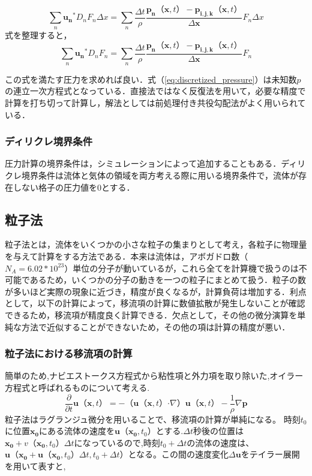 \documentclass[a4j,12pt]{jreport}
\begin{document}
$$ \sum_{n}\bm{u_n}^*D_nF_n\varDelta x = \sum_{n}\frac{\varDelta t}{\rho}\frac{\bm{p_n}（\bm{x},t） - \bm{p_{i,j,k}}（\bm{x},t）}{\varDelta \bm{x}}F_n\varDelta x $$
式を整理すると，
\begin{equation}\label{eq:discretized_pressure}
\sum_{n}\bm{u_n}^*D_nF_n= \sum_{n}\frac{\varDelta t}{\rho}\frac{\bm{p_n}（\bm{x},t） - \bm{p_{i,j,k}}（\bm{x},t）}{\varDelta \bm{x}}F_n
\end{equation} 

この式を満たす圧力を求めれば良い．式（\ref{eq:discretized_pressure}）は未知数$p$の連立一次方程式となっている．直接法ではなく反復法を用いて，必要な精度で計算を打ち切って計算し，解法としては前処理付き共役勾配法がよく用いられている．

\subsubsection{ディリクレ境界条件} \label{subsec:Dirichlet}
圧力計算の境界条件は，シミュレーションによって追加することもある．ディリクレ境界条件は流体と気体の領域を両方考える際に用いる境界条件で，流体が存在しない格子の圧力値を$0$とする．
\subsection{粒子法} \label{subsec:particle}
粒子法とは，流体をいくつかの小さな粒子の集まりとして考え，各粒子に物理量を与えて計算をする方法である．本来は流体は，アボガドロ数（$N_A = 6.02*10^{23}$）単位の分子が動いているが，これら全てを計算機で扱うのは不可能であるため，いくつかの分子の動きを一つの粒子にまとめて扱う．粒子の数が多いほど実際の現象に近づき，精度が良くなるが，計算負荷は増加する．利点として，以下の計算によって，移流項の計算に数値拡散が発生しないことが確認できるため，移流項が精度良く計算できる．欠点として，その他の微分演算を単純な方法で近似することができないため，その他の項は計算の精度が悪い．
\subsubsection{粒子法における移流項の計算} \label{subsec:particleadvect}
簡単のため,ナビエストークス方程式から粘性項と外力項を取り除いた,オイラー方程式と呼ばれるものについて考える.
$$\frac{\partial}{\partial t}\bm{u}（\bm{x},t） = -（\bm{u}（\bm{x},t）\boldsymbol{\cdot}\nabla）\bm{u}（\bm{x},t） - \frac{1}{\rho}\nabla \bm{p}$$
粒子法はラグランジュ微分を用いることで、移流項の計算が単純になる。
時刻$t_0$に位置$\bm{x_0}$にある流体の速度を$\bm{u}（\bm{x_0},t_0）$とする.$\varDelta t$秒後の位置は$\bm{x_0}+v（\bm{x_0},t_0）\varDelta t$になっているので,時刻$t_0+\varDelta t$の流体の速度は、$\bm{u}（\bm{x_0}+\bm{u}（\bm{x_0},t_0）\varDelta t,t_0+\varDelta t）$となる。この間の速度変化$\varDelta \bm{u}$をテイラー展開を用いて表すと,
\end{document}
